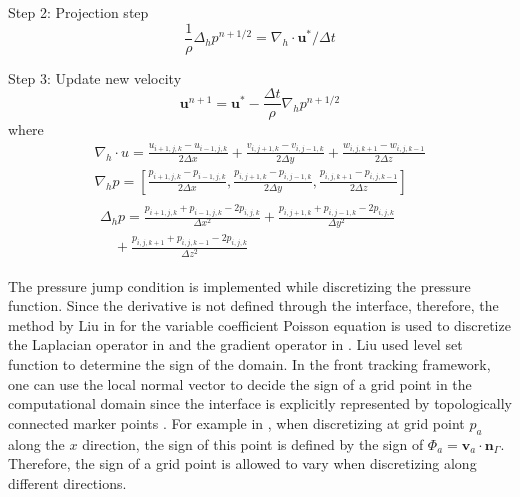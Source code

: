 Step 2: Projection step
\begin{equation} \frac{1}{\rho}\Delta_h p^{n+1/2} =
\nabla_h\cdot \mathbf{u}^*/\Delta t \label{proj} \end{equation}

Step 3: Update new velocity
\begin{equation} \mathbf{u}^{n+1} = \mathbf{u}^* -
\frac{\Delta t}{\rho}\nabla_h p^{n+1/2} \label{newvel} \end{equation}
where
\begin{eqnarray} \label{divU} \nabla_h\cdot u =
\frac{u_{i+1,j,k}-u_{i-1,j,k}}{2\Delta x} +
\frac{v_{i,j+1,k}-v_{i,j-1,k}}{2\Delta y} +
\frac{w_{i,j,k+1}-w_{i,j,k-1}}{2\Delta z}\\ \label{gradP} \nabla_h p =
[\frac{p_{i+1,j,k}-p_{i-1,j,k}}{2\Delta x},
\frac{p_{i,j+1,k}-p_{i,j-1,k}}{2\Delta y},
\frac{p_{i,j,k+1}-p_{i,j,k-1}}{2\Delta z}]\\    \label{lapP} 
\begin{aligned}
\Delta_h p = \frac{p_{i+1,j,k}+p_{i-1,j,k}-2p_{i,j,k}}{\Delta x^2} +
\frac{p_{i,j+1,k}+p_{i,j-1,k}-2p_{i,j,k}}{\Delta y^2} \\ \quad
+\frac{p_{i,j,k+1}+p_{i,j,k-1}-2p_{i,j,k}}{\Delta z^2} \end{aligned}
\end{eqnarray}

The pressure jump condition is implemented while discretizing the pressure
function. Since the derivative is not defined through the interface, therefore,
the method by Liu in \cite{liu2000boundary} for the variable coefficient
Poisson equation is used to discretize the Laplacian operator in  and
the gradient operator in .  Liu used level set function
\cite{osher1988fronts} to determine the sign of the domain. In the front
tracking framework, one can use the local normal vector to decide the sign of a
grid point in the computational domain since the interface is explicitly
represented by topologically connected marker points \cite{GliGroLi98}.  For
example in , when discretizing at grid point $p_a$ along the $x$
direction, the sign of this point is defined by the sign of $\Phi_a =
\mathbf{v}_a\cdot \mathbf{n}_{\Gamma}$.  Therefore, the sign of a grid point is
allowed to vary when discretizing along different directions.

